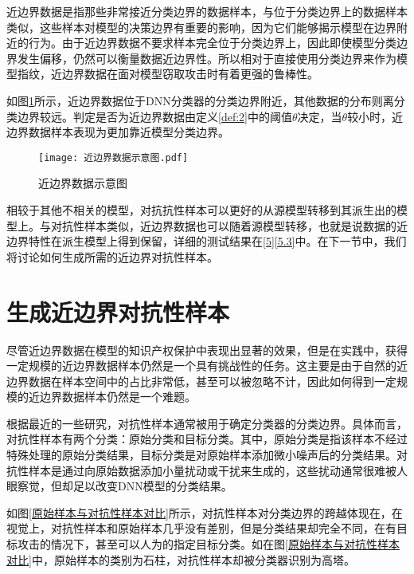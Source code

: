 近边界数据是指那些非常接近分类边界的数据样本，与位于分类边界上的数据样本类似，这些样本对模型的决策边界有重要的影响，因为它们能够揭示模型在边界附近的行为。由于近边界数据不要求样本完全位于分类边界上，因此即使模型分类边界发生偏移，仍然可以衡量数据近边界性。所以相对于直接使用分类边界来作为模型指纹，近边界数据在面对模型窃取攻击时有着更强的鲁棒性。

如图\ref{近边界数据示意图}所示，近边界数据位于DNN分类器的分类边界附近，其他数据的分布则离分类边界较远。判定是否为近边界数据由定义\ref{def:2}中的阈值$\theta$决定，当$\theta$较小时，近边界数据样本表现为更加靠近模型分类边界。

\begin{figure}[htbp]%
	\centering
	\setlength{\abovecaptionskip}{5mm} %
	\vspace{-2mm}
	\setlength{\belowcaptionskip}{-3mm} %
	\texttt{[image: 近边界数据示意图.pdf]}
	\caption{近边界数据示意图}
	\label{近边界数据示意图}
	\end {figure}
		
相较于其他不相关的模型，对抗抗性样本可以更好的从源模型转移到其派生出的模型上。与对抗性样本类似，近边界数据也可以随着源模型转移，也就是说数据的近边界特性在派生模型上得到保留，详细的测试结果在\ref{5}\ref{5.3}中。在下一节中，我们将讨论如何生成所需的近边界对抗性样本。

\section{生成近边界对抗性样本}\label{3.2}

尽管近边界数据在模型的知识产权保护中表现出显著的效果，但是在实践中，获得一定规模的近边界数据样本仍然是一个具有挑战性的任务。这主要是由于自然的近边界数据在样本空间中的占比非常低，甚至可以被忽略不计，因此如何得到一定规模的近边界数据样本仍然是一个难题。

根据最近的一些研究\cite{cao2021ipguard}，对抗性样本通常被用于确定分类器的分类边界。具体而言，对抗性样本有两个分类：原始分类和目标分类。其中，原始分类是指该样本不经过特殊处理的原始分类结果，目标分类是对原始样本添加微小噪声后的分类结果。对抗性样本是通过向原始数据添加小量扰动或干扰来生成的，这些扰动通常很难被人眼察觉，但却足以改变DNN模型的分类结果。

如图\ref{原始样本与对抗性样本对比}所示，对抗性样本对分类边界的跨越体现在，在视觉上，对抗性样本和原始样本几乎没有差别，但是分类结果却完全不同，在有目标攻击的情况下，甚至可以人为的指定目标分类。如在图\ref{原始样本与对抗性样本对比}中，原始样本的类别为石柱，对抗性样本却被分类器识别为高塔。

